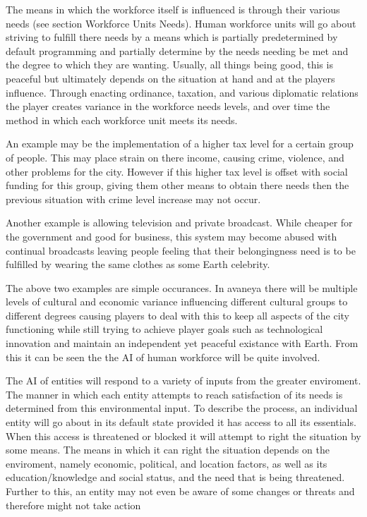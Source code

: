 The means in which the workforce itself is influenced is through their various needs (see section Workforce Units Needs). Human workforce units will go about striving to fulfill there needs by a means which is partially predetermined by default programming and partially determine by the needs needing be met and the degree to which they are wanting. Usually, all things being good, this is peaceful but ultimately depends on the situation at hand and at the players influence. Through enacting ordinance, taxation, and various diplomatic relations the player creates variance in the workforce needs levels, and over time the method in which each workforce unit meets its needs.

An example may be the implementation of a higher tax level for a certain group of people. This may place strain on there income, causing crime, violence, and other problems for the city. However if this higher tax level is offset with social funding for this group, giving them other means to obtain there needs then the previous situation with crime level increase may not occur. 

Another example is allowing television and private broadcast. While cheaper for the government and good for business, this system may become abused with continual broadcasts leaving people feeling that their belongingness need is to be fulfilled by wearing the same clothes as some Earth celebrity. 

The above two examples are simple occurances. In avaneya there will be multiple levels of cultural and economic variance influencing different cultural groups to different degrees causing players to deal with this to keep all aspects of the city functioning while still trying to achieve player goals such as technological innovation and maintain an independent yet peaceful existance with Earth. From this it can be seen the the AI of human workforce will be quite involved.   

The AI of entities will respond to a variety of inputs from the greater enviroment. The manner in which each entity attempts to reach satisfaction of its needs is determined from this environmental input. To describe the process, an individual entity will go about in its default state provided it has access to all its essentials. When this access is threatened or blocked it will attempt to right the situation by some means. The means in which it can right the situation depends on the enviroment, namely economic, political, and location factors, as well as its education/knowledge and social status, and the need that is being threatened. Further to this, an entity may not even be aware of some changes or threats and therefore might not take action

